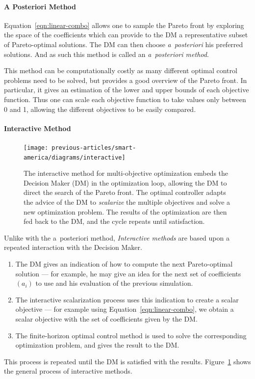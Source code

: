 			\paragraph{A Posteriori Method}
				Equation~\eqref{eqn:linear-combo} allows one to sample the Pareto front by exploring the space of the coefficients which can provide to the DM a representative subset of Pareto-optimal solutions. The DM can then choose {\it a~posteriori} his preferred solutions. And as such this method is called an \emph{a~posteriori method}.

				This method can be computationally costly as many different optimal control problems need to be solved, but provides a good overview of the Pareto front. In particular, it gives an estimation of the lower and upper bounds of each objective function. Thus one can scale each objective function to take values only between 0 and 1, allowing the different objectives to be easily compared.
			\paragraph{Interactive Method}
				\begin{figure}[ht]
					\centering
					  \texttt{[image: previous-articles/smart-america/diagrams/interactive]}
					\caption{The interactive method for multi-objective optimization embeds the Decision Maker (DM) in the optimization loop, allowing the DM to direct the search of the Pareto front. The optimal controller adapts the advice of the DM to \emph{scalarize} the multiple objectives and solve a new optimization problem. The results of the optimization are then fed back to the DM, and the cycle repeats until satisfaction.}
					\label{fig:interactive}
				\end{figure}
				Unlike with the a~posteriori method, \emph{Interactive methods} are based upon a repeated interaction with the Decision Maker.
				\begin{enumerate}
					\item The DM gives an indication of how to compute the next Pareto-optimal solution --- for example, he may give an idea for the next set of coefficients $(a_i)$ to use and his evaluation of the previous simulation.
					\item The interactive scalarization process uses this indication to create a scalar objective --- for example using Equation~\eqref{eqn:linear-combo}, we obtain a scalar objective with the set of coefficients given by the DM.
					\item The finite-horizon optimal control method is used to solve the corresponding optimization problem, and gives the result to the DM.
				\end{enumerate}
				This process is repeated until the DM is satisfied with the results. Figure~\ref{fig:interactive} shows the general process of interactive methods.


